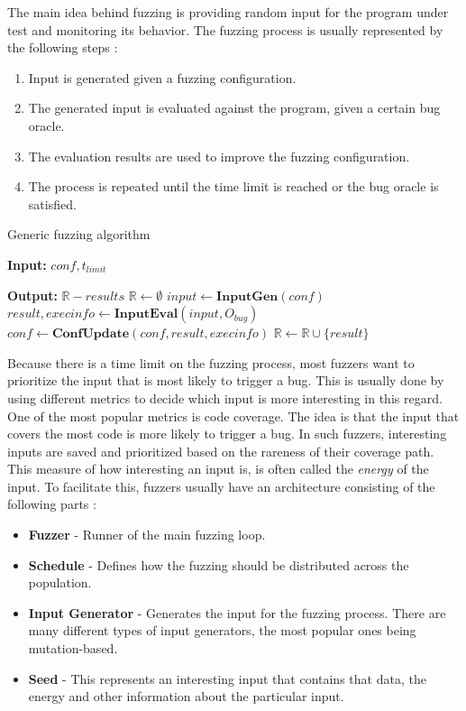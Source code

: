The main idea behind fuzzing is providing random input for the program under test and monitoring its behavior.
The fuzzing process is usually represented by the following steps \cite{manes_art_2019}:
\begin{enumerate}
    \item Input is generated given a fuzzing configuration.
    \item The generated input is evaluated against the program, given a certain bug oracle.
    \item The evaluation results are used to improve the fuzzing configuration.
    \item The process is repeated until the time limit is reached or the bug oracle is satisfied.
\end{enumerate}

\begin{algorithm}
    \caption{Generic fuzzing algorithm}\label{alg:fuzz}
    \begin{algorithmic}
        \item \textbf{Input: } $conf, t_{limit}$
        \item \textbf{Output: } $\mathbb{R} - results$
        \State $\mathbb{R} \gets \emptyset$
        \State $input \gets \textbf{InputGen}(conf)$
        \State $result, execinfo \gets \textbf{InputEval}(input, O_{bug})$
        \State $conf \gets \textbf{ConfUpdate}(conf, result, execinfo)$
        \State $\mathbb{R} \gets \mathbb{R} \cup \{result\}$
        \EndWhile
    \end{algorithmic}
\end{algorithm}

Because there is a time limit on the fuzzing process, most fuzzers want to prioritize the input that is most likely to trigger a bug.
This is usually done by using different metrics to decide which input is more interesting in this regard.
One of the most popular metrics is code coverage.
The idea is that the input that covers the most code is more likely to trigger a bug.
In such fuzzers, interesting inputs are saved and prioritized based on the rareness of their coverage path.
This measure of how interesting an input is, is often called the \textit{energy} of the input.
To facilitate this, fuzzers usually have an architecture consisting of the following parts \cite{zeller_greybox_2023}:
\begin{itemize}
    \item \textbf{Fuzzer} - Runner of the main fuzzing loop.
    \item \textbf{Schedule} - Defines how the fuzzing should be distributed across the population.
    \item \textbf{Input Generator} - Generates the input for the fuzzing process. There are many different types of input generators, the most popular ones being mutation-based.
    \item \textbf{Seed} - This represents an interesting input that contains that data, the energy and other information about the particular input.
\end{itemize}

